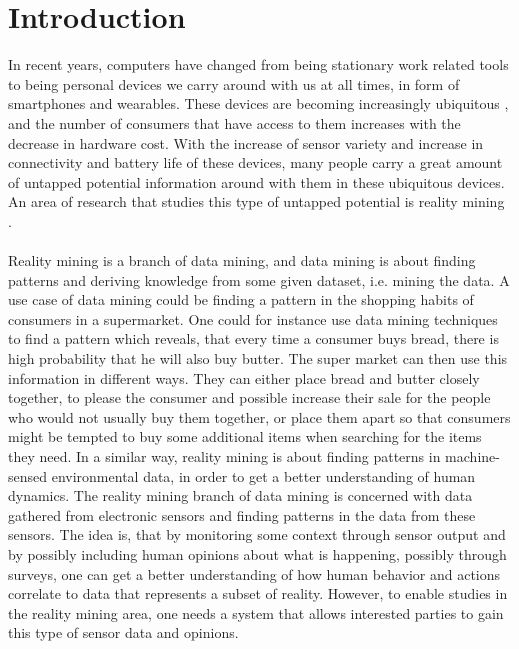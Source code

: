 \chapter{Introduction}
\label{cha:introduction}

In recent years, computers have changed from being stationary work related tools to being personal devices we carry around with us at all times, in form of smartphones and wearables. These devices are becoming increasingly ubiquitous \parencite{statsia_fitbit}\parencite{android_os_market_share}, and the number of consumers that have access to them increases with the decrease in hardware cost. With the increase of sensor variety and increase in connectivity and battery life of these devices, many people carry a great amount of untapped potential information around with them in these ubiquitous devices. An area of research that studies this type of untapped potential is reality mining \parencite{eagle2006_reality_mining_definition}.
\\\\
Reality mining is a branch of data mining, and data mining is about finding patterns and deriving knowledge from some given dataset, i.e. mining the data. A use case of data mining could be finding a pattern in the shopping habits of consumers in a supermarket. One could for instance use data mining techniques to find a pattern which reveals, that every time a consumer buys bread, there is high probability that he will also buy butter.
The super market can then use this information in different ways. They can either place bread and butter closely together, to please the consumer and possible increase their sale for the people who would not usually buy them together, or place them apart so that consumers might be tempted to buy some additional items when searching for the items they need. In a similar way, reality mining is about finding patterns in machine-sensed environmental data, in order to get a better understanding of human dynamics. The reality mining branch of data mining is concerned with data gathered from electronic sensors and finding patterns in the data from these sensors. The idea is, that by monitoring some context through sensor output and by possibly including human opinions about what is happening, possibly through surveys, one can get a better understanding of how human behavior and actions correlate to data that represents a subset of reality. However, to enable studies in the reality mining area, one needs a system that allows interested parties to gain this type of sensor data and opinions. 
